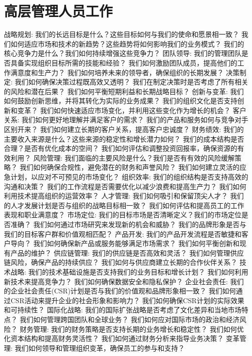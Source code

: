 \documentclass[12pt]{book}
\begin{document}
\section{高层管理人员工作}
战略规划:
我们的长远目标是什么？这些目标如何与我们的使命和愿景相一致？
我们如何适应市场和技术的新趋势？这些趋势将如何影响我们的业务模式？
我们的核心竞争力是什么？我们如何持续增强这些竞争力？
团队领导:
我们的管理团队是否具备实现组织目标所需的技能和经验？
我们如何激励团队成员，提高他们的工作满意度和生产力？
我们如何培养未来的领导者，确保组织的长期发展？
决策制定:
我们如何确保决策过程既高效又透明？
我们在制定决策时是否考虑了所有相关的风险和潜在后果？
我们如何平衡短期利益和长期战略目标？
创新与变革:
我们如何鼓励创新思维，并将其转化为实际的业务成果？
我们的组织文化是否支持创新和变革？
我们如何快速适应市场变化，并利用这些变化作为增长的机会？
客户关系:
我们如何更好地理解并满足客户的需求？
我们的产品和服务如何与竞争对手区别开来？
我们如何建立长期的客户关系，提高客户忠诚度？
财务绩效:
我们的主要收入来源是什么？这些来源的稳定性和增长潜力如何？
我们的成本结构是否合理？是否有优化成本的空间？
我们如何评估和调整投资回报率，确保资源的有效利用？
风险管理:
我们面临的主要风险是什么？我们是否有有效的风险缓解策略？
我们如何确保合规性，避免潜在的财务和声誉风险？
我们如何建立灵活的应急计划，以应对不可预见的市场变化？
组织效率:
我们的组织结构是否支持高效的沟通和决策？
我们的工作流程是否需要优化以减少浪费和提高生产力？
我们如何利用技术提高组织的运营效率？
人才管理:
我们如何吸引和保留顶尖人才？
我们的人才发展计划是否与组织的战略目标相一致？
我们如何评估和提高员工的工作表现和职业满意度？
市场定位:
我们的目标市场是否清晰定义？我们的市场定位是否准确？
我们如何通过市场研究来发现新的机会和威胁？
我们的品牌形象是否与我们的目标客户群和价值观相匹配？
产品开发:
我们的产品开发流程是否敏捷和客户导向？
我们如何确保新产品或服务能够满足市场需求？
我们如何平衡创新和现有产品的维护？
供应链管理:
我们的供应链是否高效和灵活？
我们如何管理供应链风险，确保产品的持续供应？
我们如何与供应商建立长期的合作伙伴关系？
技术战略:
我们的技术基础设施是否支持我们的业务目标和增长计划？
我们如何利用新技术来提高竞争力？
我们如何确保数据安全和隐私保护？
企业社会责任:
我们的企业社会责任(CSR)计划是否与我们的价值观和品牌形象相一致？
我们如何通过CSR活动来提升企业的社会形象和影响力？
我们如何确保CSR计划的实际效果和可持续性？
国际化战略:
我们的国际扩张战略是否考虑了文化差异和当地市场特点？
我们如何管理跨国团队和全球业务？
我们如何应对国际市场的政治和经济风险？
财务管理:
我们的财务策略是否支持长期的业务增长和稳定性？
我们如何优化资本结构和提高财务灵活性？
我们如何通过财务分析来指导业务决策？
变革管理:
我们如何领导和管理组织变革，确保员工的参与和支持？
\end{document}
